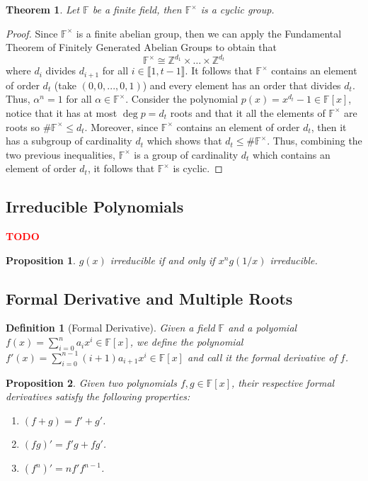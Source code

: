 \documentclass{article}
\newtheorem*{theorem}{Theorem}
\newtheorem*{proposition}{Proposition}
\newtheorem*{definition}{Definition}
\newcommand{\Z}{\mathbb{Z}}
\newcommand{\F}{\mathbb{F}}
\newcommand{\Iint}[2]{\llbracket #1 , #2 \rrbracket}
\newcommand{\td}{\textcolor{red}{\textbf{TODO}}}
\newcommand{\isomorphic}{\cong}
\begin{document}
\begin{theorem}
    Let $\F$ be a finite field, then $\F^{\times}$ is a cyclic group.
\end{theorem}

\begin{proof}
    Since $\F^{\times}$ is a finite abelian group, then we can apply the Fundamental Theorem of Finitely Generated Abelian Groups to obtain that
    $$\F^{\times} \isomorphic \Z^{d_1} \times \dots \times \Z^{d_t}$$
    where $d_i$ divides $d_{i+1}$ for all $i \in \Iint{1}{t-1}$. It follows that $\F^{\times}$ contains an element of order $d_t$ (take $(0,0, ..., 0, 1)$) and every element has an order that divides $d_t$. Thus, $\alpha^n = 1$ for all $\alpha \in \F^{\times}$. Consider the polynomial $p(x) = x^{d_t} - 1 \in \F[x]$, notice that it has at most $\deg p = d_t$ roots and that it all the elements of $\F^{\times}$ are roots so $\# \F^{\times} \leq d_t$. Moreover, since $\F^{\times}$ contains an element of order $d_t$, then it has a subgroup of cardinality $d_t$ which shows that $d_t \leq \# \F^{\times}$. Thus, combining the two previous inequalities, $\F^{\times}$ is a group of cardinality $d_t$ which contains an element of order $d_t$, it follows that $\F^{\times}$ is cyclic.
\end{proof}


\subsection{Irreducible Polynomials}

\td 

\begin{proposition}
    $g(x)$ irreducible if and only if $x^ng(1/x)$ irreducible.
\end{proposition}

\subsection{Formal Derivative and Multiple Roots}

\begin{definition}[Formal Derivative]
    Given a field $\F$ and a polyomial $f(x) = \sum_{i=0}^{n}a_ix^i \in \F[x]$, we define the polynomial $f'(x) = \sum_{i=0}^{n-1}(i+1)a_{i+1}x^i \in \F[x]$ and call it the formal derivative of $f$.
\end{definition}

\begin{proposition}
    Given two polynomials $f,g \in \F[x]$, their respective formal derivatives satisfy the following properties:
    \begin{enumerate}
        \item $(f + g) = f' + g'$.
        \item $(fg)' = f'g + fg'$.
        \item $(f^n)' = nf' f^{n-1}$.
    \end{enumerate}
\end{proposition}
\end{document}
